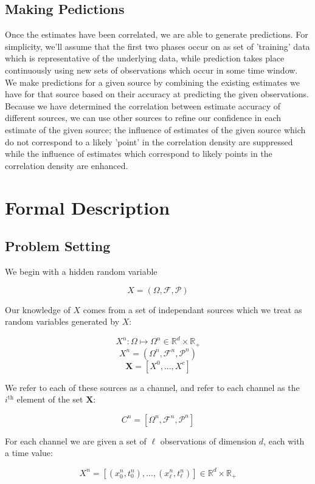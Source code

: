 \documentclass[10pt]{article}
\begin{document}
\subsection{Making Pedictions}
Once the estimates have been correlated, we are able to generate predictions.  For simplicity, we'll assume that the first two phases occur on as set of 'training' data which is representative of the underlying data, while prediction takes place continuously using new sets of observations which occur in some time window.  We make predictions for a given source by combining the existing estimates we have for that source based on their accuracy at predicting the given observations.  Because we have determined the correlation between estimate accuracy of different sources, we can use other sources to refine our confidence in each estimate of the given source; the influence of estimates of the given source which do not correspond to a likely 'point' in the correlation density are suppressed while the influence of estimates which correspond to likely points in the correlation density are enhanced.

\section{Formal Description}
\subsection{Problem Setting}
We begin with a hidden random variable 

\[ X = (\Omega,\mathcal{F},\mathcal{P}) \]

Our knowledge of \( X \) comes from a set of independant sources which we treat as random variables generated by \( X \):

\[ X^n : \Omega \mapsto \Omega^n \in \mathbb{R}^d \times \mathbb{R}_+  \]
\[ X^n = (\Omega^n,\mathcal{F}^n,\mathcal{P}^n) \]
\[ \mathbf{X} = [X^0,...,X^c]   \]

We refer to each of these sources as a channel, and refer to each channel as the \( i^\text{th} \) element of the set \( \mathbf{X} \):

\[ C^n = [\Omega^n,\mathcal{F}^n,\mathcal{P}^n] \]

For each channel we are given a set of \( \ell \) observations of dimension \( d \), each with a time value:

\[ X^n = \left[ (x_0^n,t_0^n),...,(x_\ell^n,t_\ell^n) \right] \in \mathbb{R}^d \times \mathbb{R}_+ \]
\end{document}
